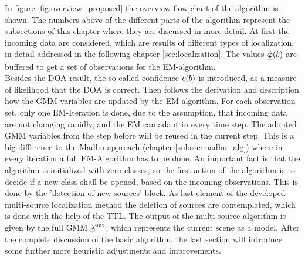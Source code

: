 In figure \ref{fig:overview_proposed} the overview flow chart of the algorithm is shown. The numbers above of the different parts of the algorithm represent the subsections of this chapter where they are discussed in more detail. At first the incoming data are considered, which are results of different types of localization, in detail addressed in the following chapter \ref{sec:localization}. The values $\underline{\hat{\varphi}}(b)$ are buffered to get a set of observations for the \ac{EM}-algorithm.\\
Besides the \ac{DOA} result, the so-called confidence $\underline{c}(b)$ is introduced, as a measure of likelihood that the \ac{DOA} is correct.
Then follows the derivation and description how the GMM variables are updated by the  \ac{EM}-algorithm.
For each observation set, only one EM-Iteration is done, due to the assumption, that incoming data are not changing rapidly, and the EM can adapt in every time step.
The adopted \ac{GMM} variables from the step before will be reused in the current step. This is a big difference to the Madhu approach (chapter \ref{subsec:madhu_alg}) where in every iteration a full EM-Algorithm has to be done.
An important fact is that the algorithm is initialized with zero classes, so the first action of the algorithm is to decide if a new class shall be opened, based on the incoming observations. This is done by the 'detection of
new sources' block.
As last element of the developed multi-source localization method the deletion of sources are contemplated, which is done with the help of the \ac{TTL}. The output of the multi-source algorithm is given by the full \ac{GMM} $\underline{\lambda}^\text{out}$, which represents the current scene as a model. After the complete discussion of the basic algorithm, the last section will introduce some further more heuristic adjustments and improvements.



